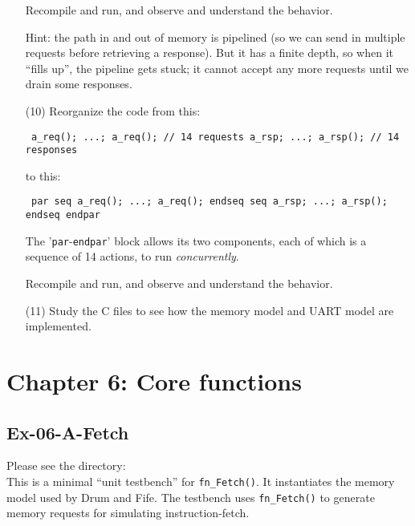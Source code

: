 \begin{itemize}
    Recompile and run, and observe and understand the behavior.

    Hint: the path in and out of memory is pipelined (so we can send
    in multiple requests before retrieving a response).  But it has a
    finite depth, so when it ``fills up'', the pipeline gets stuck; it
    cannot accept any more requests until we drain some responses.

\item[(10)] Reorganize the code from this:

    \begin{tabbing}\footnotesize\tt
    a\_req(); ...; a\_req();    // 14 requests
    a\_rsp; ...; a\_rsp();      // 14 responses
    \end{tabbing}

    to this:

    \begin{tabbing}\footnotesize\tt
    par
       seq a\_req(); ...; a\_req(); endseq
       seq a\_rsp; ...; a\_rsp();   endseq
    endpar
    \end{tabbing}

    The '\verb|par|-\verb|endpar|' block allows its two components,
    each of which is a sequence of 14 actions, to run \emph{concurrently}.

    Recompile and run, and observe and understand the behavior.

\item[(11)] Study the C files to see how the memory model and UART
    model are implemented.

\end{itemize}


\hdivider

\section*{Chapter 6: Core functions}


\subsection*{Ex-06-A-Fetch}

\label{Ex-06-A-Fetch}

Please see the directory:  \\
This is a minimal ``unit testbench'' for \verb|fn_Fetch()|.  It
instantiates the memory model used by Drum and Fife.  The testbench
uses \verb|fn_Fetch()| to generate memory requests for simulating
instruction-fetch.

